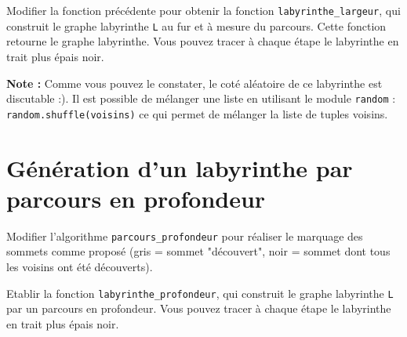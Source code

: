 \begin{question}
Modifier la fonction précédente pour obtenir la fonction \lstinline{labyrinthe_largeur}, qui construit le graphe labyrinthe \lstinline{L} au fur et à mesure du parcours. Cette fonction retourne le graphe labyrinthe. Vous pouvez tracer à chaque étape le labyrinthe en trait plus épais noir. 
\end{question}

\textbf{Note :} Comme vous pouvez le constater, le coté aléatoire de ce labyrinthe est discutable :). Il est possible de mélanger une liste en utilisant le module \lstinline{random} : \lstinline{random.shuffle(voisins)} ce qui permet de mélanger la liste de tuples voisins.

\section*{Génération d'un labyrinthe par parcours en profondeur}
\begin{question}
Modifier l'algorithme \lstinline{parcours_profondeur}  pour réaliser le marquage des sommets comme proposé (gris = sommet "découvert", noir = sommet dont tous les voisins ont été découverts).
\end{question}

\begin{question}
Etablir la fonction \lstinline{labyrinthe_profondeur}, qui construit le graphe labyrinthe \lstinline{L} par un parcours en profondeur. Vous pouvez tracer à chaque étape le labyrinthe en trait plus épais noir. 
\end{question}

